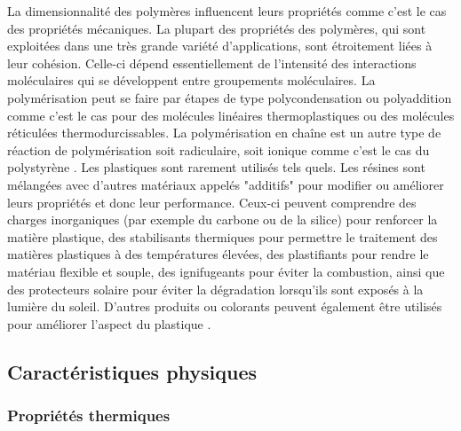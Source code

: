 \par{
La dimensionnalit\'e des polym\`eres influencent leurs propri\'et\'es comme c'est le cas des propri\'et\'es m\'ecaniques. La  plupart  des  propri\'et\'es  des  polym\`eres,  qui  sont  exploit\'ees  dans  une  tr\`es  grande  vari\'et\'e d'applications,  sont  \'etroitement  li\'ees  \`a  leur  coh\'esion.  Celle-ci  d\'epend  essentiellement  de l'intensit\'e des interactions mol\'eculaires qui se d\'eveloppent entre groupements mol\'eculaires. La polym\'erisation peut se faire par \'etapes de type polycondensation ou polyaddition comme c'est le cas pour des mol\'ecules lin\'eaires thermoplastiques ou des mol\'ecules r\'eticul\'ees thermodurcissables. La polym\'erisation en cha\^ine est un autre type de r\'eaction de polym\'erisation soit radiculaire, soit ionique comme c'est le cas du polystyr\`ene {\citep{fontanille2014chimie}}. Les plastiques sont rarement utilis\'es tels quels. Les r\'esines sont m\'elang\'ees avec d'autres mat\'eriaux appel\'es "additifs" pour modifier ou am\'eliorer leurs propri\'et\'es et donc leur performance. Ceux-ci peuvent comprendre des charges inorganiques (par exemple du carbone ou de la silice) pour renforcer la mati\`ere plastique, des stabilisants thermiques pour permettre le traitement des mati\`eres plastiques \`a des temp\'eratures \'elev\'ees, des plastifiants pour rendre le mat\'eriau flexible et souple, des ignifugeants pour \'eviter la combustion, ainsi que des protecteurs solaire pour \'eviter la d\'egradation lorsqu'ils sont expos\'es \`a la lumi\`ere du soleil. D'autres produits ou colorants peuvent \'egalement \^etre utilis\'es pour am\'eliorer l'aspect du plastique {\citep{andrady2009applications}}.
}

\subsection{Caract\'eristiques physiques}
\subsubsection{Propri\'et\'es thermiques}

